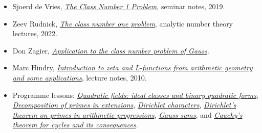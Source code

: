 \documentclass[
  11pt,
  a4paper,
]{article}
\providecommand{\tightlist}{%
  \setlength{\itemsep}{0pt}\setlength{\parskip}{0pt}}
\begin{document}
\begin{itemize}
\tightlist
\item
  Sjoerd de Vries,
  \href{https://staff.math.su.se/sjoerd.devries/files/Classnumbers.pdf}{\emph{The
  Class Number 1 Problem}}, seminar notes, 2019.
\item
  Zeev Rudnick,
  \href{https://www.math.tau.ac.il/~rudnick/courses/analytic\%20number\%20theory\%202022/Lecture_10:The_class_number_one_problem.pdf}{\emph{The
  class number one problem}}, analytic number theory lectures, 2022.
\item
  Don Zagier,
  \href{https://people.mpim-bonn.mpg.de/zagier/files/scanned/LseriesBSDandClassNumberGauss/fulltext.pdf}{\emph{Application
  to the class number problem of Gauss}}.
\item
  Marc Hindry,
  \href{https://webusers.imj-prg.fr/~marc.hindry/Notes_rev_Brasilia.pdf}{\emph{Introduction
  to zeta and L-functions from arithmetic geometry and some
  applications}}, lecture notes, 2010.
\item
  Programme lessons:
  \href{https://kokunoyumeto.github.io/open-math-courses-public/courses/NT-ANT/quadratic-fields-ideal-classes-and-binary-quadratic-forms.html}{\emph{Quadratic
  fields: ideal classes and binary quadratic forms}},
  \href{https://kokunoyumeto.github.io/open-math-courses-public/courses/NT-ANT/decomposition-of-primes-in-extensions.html}{\emph{Decomposition
  of primes in extensions}},
  \href{https://kokunoyumeto.github.io/open-math-courses-public/courses/NT-DIRL/NT-DIRL-01.html}{\emph{Dirichlet characters}},
  \href{https://kokunoyumeto.github.io/open-math-courses-public/courses/NT-DIRL/NT-DIRL-02.html}{\emph{Dirichlet's theorem on
  primes in arithmetic progressions}},
  \href{https://kokunoyumeto.github.io/open-math-courses-public/courses/NT-DIRL/NT-DIRL-03.html}{\emph{Gauss sums}}, and
  \href{https://kokunoyumeto.github.io/open-math-courses-public/courses/foundations-of-von-neumann-algebras/cauchy-s-theorem-for-cycles-and-its-consequences.html}{\emph{Cauchy's
  theorem for cycles and its consequences}}.
\end{itemize}
\end{document}
